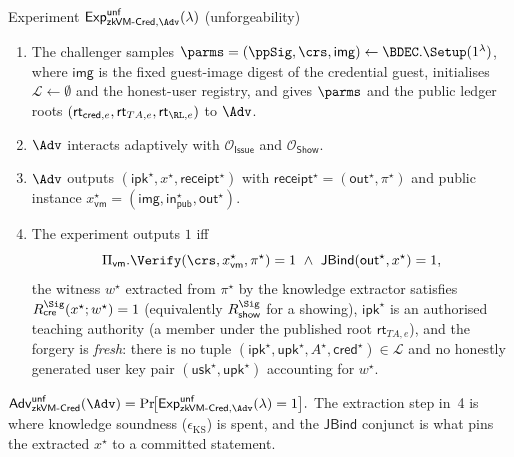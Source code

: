\begin{gamebox}{Experiment $\mathsf{Exp}^{\mathsf{unf}}_{\mathsf{zkVM\text{-}Cred},\Adv}(\lambda)$ (unforgeability)}
\begin{enumerate}
\item The challenger samples $\parms=(\ppSig,\crs,\mathsf{img})\leftarrow\BDEC.\Setup(1^\lambda)$, where
$\mathsf{img}$ is the fixed guest-image digest of the credential guest, initialises
$\mathcal L\gets\emptyset$ and the honest-user registry, and gives $\parms$ and the public ledger roots
$(\mathsf{rt}_{\mathsf{cred},e},\mathsf{rt}_{TA,e},\mathsf{rt}_{\RL,e})$ to $\Adv$.
\item $\Adv$ interacts adaptively with $\mathcal O_{\mathsf{Issue}}$ and $\mathcal O_{\mathsf{Show}}$.
\item $\Adv$ outputs $(\mathsf{ipk}^\star,x^\star,\mathsf{receipt}^\star)$ with
$\mathsf{receipt}^\star=(\mathsf{out}^\star,\pi^\star)$ and public instance
$x_{\mathsf{vm}}^\star=(\mathsf{img},\mathsf{in}_{\mathsf{pub}}^\star,\mathsf{out}^\star)$.
\item The experiment outputs $1$ iff
\[
  \Pi_{\mathsf{vm}}.\Verify(\crs, x_{\mathsf{vm}}^\star, \pi^\star)=1
  \ \land\
  \mathsf{JBind}(\mathsf{out}^\star,x^\star)=1,
\]
the witness $w^\star$ extracted from $\pi^\star$ by the knowledge extractor satisfies
$R_{\mathsf{cre}}^{\Sig}(x^\star;w^\star)=1$ (equivalently $R_{\mathsf{show}}^{\Sig}$ for a showing),
$\mathsf{ipk}^\star$ is an authorised teaching authority (a member under the published root
$\mathsf{rt}_{TA,e}$), and the forgery is \emph{fresh}: there is no tuple
$(\mathsf{ipk}^\star,\mathsf{upk}^\star,A^\star,\mathsf{cred}^\star)\in\mathcal L$ and no honestly
generated user key pair $(\mathsf{usk}^\star,\mathsf{upk}^\star)$ accounting for $w^\star$.
\end{enumerate}
$\displaystyle
\mathsf{Adv}^{\mathsf{unf}}_{\mathsf{zkVM\text{-}Cred}}(\Adv)
=\Pr\!\bigl[\mathsf{Exp}^{\mathsf{unf}}_{\mathsf{zkVM\text{-}Cred},\Adv}(\lambda)=1\bigr].$
The extraction step in~4 is where knowledge soundness ($\epsilon_{\mathrm{KS}}$) is spent, and the
$\mathsf{JBind}$ conjunct is what pins the extracted $x^\star$ to a committed statement.
\end{gamebox}

